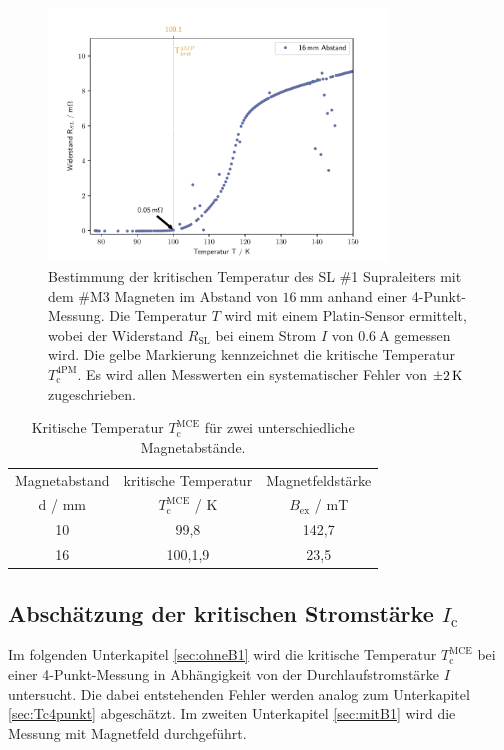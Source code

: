 \begin{figure}[H]
    \centering
    \includegraphics[width=0.8\textwidth]{Auswertung/T_krit_Pt/R_T_16mm.pdf}
    \caption{Bestimmung der kritischen Temperatur des SL \#1 Supraleiters mit dem
		\#M3 Magneten im Abstand von $\SI{16}{\milli\meter}$ anhand einer 4-Punkt-Messung.
		Die Temperatur $T$ wird mit einem Platin-Sensor	ermittelt, wobei der Widerstand
		$R_{\text{SL}}$ bei einem Strom $I$ von $\SI{0.6}{\ampere}$ gemessen wird.
		Die gelbe Markierung kennzeichnet die kritische Temperatur	$T^{\text{4PM}}_{\text{c}}$.
		Es wird allen Messwerten ein systematischer Fehler von $\SI{\pm2}{\kelvin}$
		zugeschrieben.}
    \label{fig:Tc4PM16}
\end{figure}

\begin{table}
  \centering
  \caption{Kritische Temperatur $T^{\text{MCE}}_{\text{c}}$ für zwei
	unterschiedliche Magnetabstände.}
  \label{tab:Tc4PM1016}
  \begin{tabular}{S | S S}
    \toprule
    {Magnetabstand} & {kritische Temperatur} & {Magnetfeldstärke} \\
    {d / mm} & {$T^{\text{MCE}}_{\text{c}}$ / K } & {$B_{\text{ex}}$ / mT} \\
    \midrule
    {10} & {99,8}	&	{142,7}	\\
		{16} & {100,1,9}	&	{23,5}	\\
    \bottomrule
  \end{tabular}
\end{table}

\subsection{Abschätzung der kritischen Stromstärke $I_{\text{c}}$}
\label{sec:Ic}
Im folgenden Unterkapitel \ref{sec:ohneB1} wird die kritische Temperatur
$T^{\text{MCE}}_{\text{c}}$ bei einer 4-Punkt-Messung in Abhängigkeit von der
Durchlaufstromstärke $I$ untersucht. Die dabei entstehenden Fehler werden analog
zum Unterkapitel \ref{sec:Tc4punkt} abgeschätzt. Im zweiten Unterkapitel
\ref{sec:mitB1} wird die Messung mit Magnetfeld durchgeführt.

